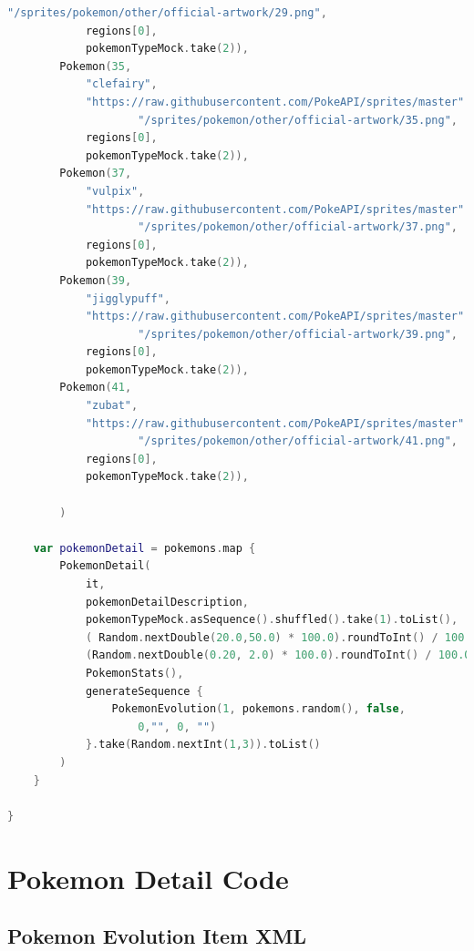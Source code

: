 \documentclass[a4paper, 12pt]{article}
\begin{document}
\begin{lstlisting}[caption={PokemonMockData Object.}, label={code:mockData}, language=Kotlin]
                    "/sprites/pokemon/other/official-artwork/29.png",
            regions[0],
            pokemonTypeMock.take(2)),
        Pokemon(35,
            "clefairy",
            "https://raw.githubusercontent.com/PokeAPI/sprites/master" +
                    "/sprites/pokemon/other/official-artwork/35.png",
            regions[0],
            pokemonTypeMock.take(2)),
        Pokemon(37,
            "vulpix",
            "https://raw.githubusercontent.com/PokeAPI/sprites/master" +
                    "/sprites/pokemon/other/official-artwork/37.png",
            regions[0],
            pokemonTypeMock.take(2)),
        Pokemon(39,
            "jigglypuff",
            "https://raw.githubusercontent.com/PokeAPI/sprites/master" +
                    "/sprites/pokemon/other/official-artwork/39.png",
            regions[0],
            pokemonTypeMock.take(2)),
        Pokemon(41,
            "zubat",
            "https://raw.githubusercontent.com/PokeAPI/sprites/master" +
                    "/sprites/pokemon/other/official-artwork/41.png",
            regions[0],
            pokemonTypeMock.take(2)),

        )

    var pokemonDetail = pokemons.map {
        PokemonDetail(
            it,
            pokemonDetailDescription,
            pokemonTypeMock.asSequence().shuffled().take(1).toList(),
            ( Random.nextDouble(20.0,50.0) * 100.0).roundToInt() / 100.0,
            (Random.nextDouble(0.20, 2.0) * 100.0).roundToInt() / 100.0,
            PokemonStats(),
            generateSequence {
                PokemonEvolution(1, pokemons.random(), false,
                    0,"", 0, "")
            }.take(Random.nextInt(1,3)).toList()
        )
    }

}
\end{lstlisting}

\section{Pokemon Detail Code}
\label{appendix:pk_detail}

\subsection{Pokemon Evolution Item XML}
\end{document}
